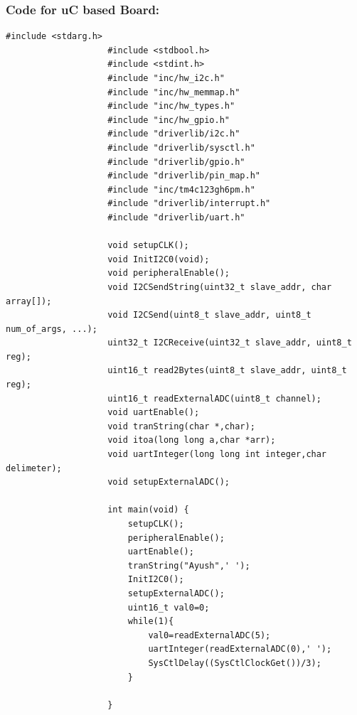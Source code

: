 \documentclass[a4paper,10pt,oneside]{article}
\begin{document}
				\subsubsection{\textbf{Code for uC based Board:}}
				\begin{lstlisting}[style=CStyle]
					#include <stdarg.h>
					#include <stdbool.h>
					#include <stdint.h>
					#include "inc/hw_i2c.h"
					#include "inc/hw_memmap.h"
					#include "inc/hw_types.h"
					#include "inc/hw_gpio.h"
					#include "driverlib/i2c.h"
					#include "driverlib/sysctl.h"
					#include "driverlib/gpio.h"
					#include "driverlib/pin_map.h"
					#include "inc/tm4c123gh6pm.h"
					#include "driverlib/interrupt.h"
					#include "driverlib/uart.h"
					
					void setupCLK();
					void InitI2C0(void);
					void peripheralEnable();
					void I2CSendString(uint32_t slave_addr, char array[]);
					void I2CSend(uint8_t slave_addr, uint8_t num_of_args, ...);
					uint32_t I2CReceive(uint32_t slave_addr, uint8_t reg);
					uint16_t read2Bytes(uint8_t slave_addr, uint8_t reg);
					uint16_t readExternalADC(uint8_t channel);
					void uartEnable();
					void tranString(char *,char);
					void itoa(long long a,char *arr);
					void uartInteger(long long int integer,char delimeter);
					void setupExternalADC();
					
					int main(void) {
						setupCLK();
						peripheralEnable();
						uartEnable();
						tranString("Ayush",' ');
						InitI2C0();
						setupExternalADC();
						uint16_t val0=0;	
						while(1){
							val0=readExternalADC(5);
							uartInteger(readExternalADC(0),' ');
							SysCtlDelay((SysCtlClockGet())/3);
						}
						
					}
					

\end{lstlisting}
\end{document}
